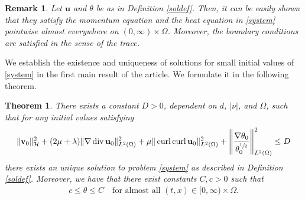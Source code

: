 \documentclass[11pt]{article}
\numberwithin{equation}{section}
\newtheorem{rem}[defi]{Remark}
\theoremstyle{plain}
\newtheorem{tw}[defi]{Theorem}
\newcommand\bb[1]{\mathbf{#1}}
\newcommand{\tn}{\Omega}
\newcommand{\ld}{L^2(\Omega)}
\newcommand{\sul}{\sfrac{1}{2}}
\renewcommand{\div}{\operatorname{div}}
\DeclareMathOperator{\curl}{curl}
\newcommand{\initcond}{\|\bb{v}_0\|^2_{\H}+(2\mu+\lambda)\|\nabla\div\bb u_0\|^2_{\ld}+\mu\|\curl\curl\bb u_0\|_{\ld}^2+\left\|\frac{\nabla\theta_0}{{\theta^{\sul}_0}}\right\|^2_{\ld}\leq D}
\newcommand{\ot}{(0,\infty)\times\Omega}
\newcommand{\bu}{\bb{u}}
\renewcommand{\H}{\mathcal{H}}
\begin{document}
\begin{rem}
Let $\bu$ and $\theta$ be as in Definition \ref{soldef}. Then, it can be easily shown that they satisfy the momentum equation and the heat equation in \eqref{system} pointwise almost everywhere on $\ot$. Moreover, the boundary conditions are satisfied in the sense of the trace.
\end{rem}

We establish the existence and uniqueness of solutions for small initial values of \eqref{system} in the first main result of the article. We formulate it in the following theorem.
\begin{tw}\label{existglm}
There exists a constant $D>0$, dependent on $d$, $|\nu|$, and $\tn$, such that for any initial values satisfying
\begin{align*}
\initcond
\end{align*} there exists an unique solution to problem \eqref{system} as described in Definition \ref{soldef}. Moreover, we have that there exist constants $C,c>0$ such that
\begin{align}\label{tezexglm}
c\leq\theta\leq C\quad\textrm{for almost all }(t,x)\in [0,\infty)\times\Omega.
\end{align}
\end{tw}
\end{document}
